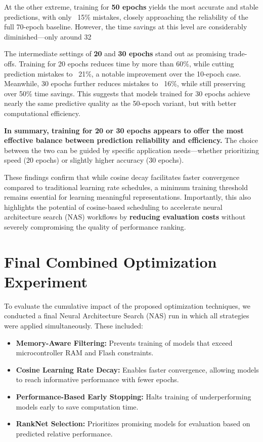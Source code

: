 At the other extreme, training for \textbf{50 epochs} yields the most accurate and stable predictions, with only ~15\% mistakes, closely approaching the reliability of the full 70-epoch baseline. However, the time savings at this level are considerably diminished—only around 32%

The intermediate settings of \textbf{20} and \textbf{30 epochs} stand out as promising trade-offs. Training for 20 epochs reduces time by more than 60\%, while cutting prediction mistakes to ~21\%, a notable improvement over the 10-epoch case. Meanwhile, 30 epochs further reduces mistakes to ~16\%, while still preserving over 50\% time savings. This suggests that models trained for 30 epochs achieve nearly the same predictive quality as the 50-epoch variant, but with better computational efficiency.

\textbf{In summary, training for 20 or 30 epochs appears to offer the most effective balance between prediction reliability and efficiency.} The choice between the two can be guided by specific application needs—whether prioritizing speed (20 epochs) or slightly higher accuracy (30 epochs).

These findings confirm that while cosine decay facilitates faster convergence compared to traditional learning rate schedules, a minimum training threshold remains essential for learning meaningful representations. Importantly, this also highlights the potential of cosine-based scheduling to accelerate neural architecture search (NAS) workflows by \textbf{reducing evaluation costs} without severely compromising the quality of performance ranking.


\section{Final Combined Optimization Experiment}

To evaluate the cumulative impact of the proposed optimization techniques, we conducted a final Neural Architecture Search (NAS) run in which all strategies were applied simultaneously. These included:

\begin{itemize}
    \item \textbf{Memory-Aware Filtering:} Prevents training of models that exceed microcontroller RAM and Flash constraints.
    \item \textbf{Cosine Learning Rate Decay:} Enables faster convergence, allowing models to reach informative performance with fewer epochs.
    \item \textbf{Performance-Based Early Stopping:} Halts training of underperforming models early to save computation time.
    \item \textbf{RankNet Selection:} Prioritizes promising models for evaluation based on predicted relative performance.
\end{itemize}


